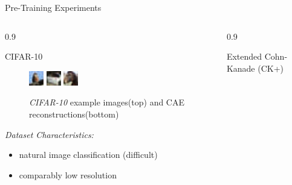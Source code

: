 \documentclass[final]{beamer}
\newlength{\onecolwid}
\newlength{\threecolwid}
\begin{document}
\begin{frame}[t]
\begin{columns}[t]
\begin{column}{\threecolwid}
\begin{alertblock}{Pre-Training Experiments}
\begin{columns}[t, totalwidth=0.9\threecolwid]
\begin{column}{0.9\onecolwid}
\begin{block}{CIFAR-10}
\begin{figure}
	\includegraphics[width=0.2\linewidth]{graphics/reconstructions/cifar/reconstruction_00.png}
	\includegraphics[width=0.2\linewidth]{graphics/reconstructions/cifar/reconstruction_01.png}
	\includegraphics[width=0.2\linewidth]{graphics/reconstructions/cifar/reconstruction_02.png}

	\caption{\emph{CIFAR-10} example images(top) and CAE reconstructions(bottom)}

	\end{figure}

	\emph{Dataset Characteristics:}\\
	\begin{itemize}
	\item natural image classification (difficult)
	\item comparably low resolution
	\end{itemize}
	\end{block}
	\end{column}

	\begin{column}{0.9\onecolwid}
	\begin{block}{Extended Cohn-Kanade (CK+)}


\end{block}
\end{column}
\end{columns}
\end{alertblock}
\end{column}
\end{columns}
\end{frame}
\end{document}
